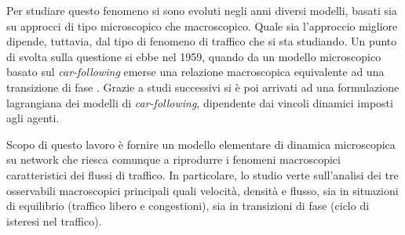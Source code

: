 \documentclass[../main.tex]{subfiles}
\begin{document}
Per studiare questo fenomeno si sono evoluti negli anni diversi modelli, basati sia su approcci di tipo microscopico che macroscopico.
Quale sia l'approccio migliore dipende, tuttavia, dal tipo di fenomeno di traffico che si sta studiando.
Un punto di svolta sulla questione si ebbe nel 1959, quando da un modello microscopico basato sul \emph{car-following} emerse una relazione macroscopica equivalente ad una transizione di fase \cite{gazis2002origins}.
Grazie a studi successivi si \`e poi arrivati ad una formulazione lagrangiana dei modelli di \emph{car-following}, dipendente dai vincoli dinamici imposti agli agenti.

Scopo di questo lavoro \`e fornire un modello elementare di dinamica microscopica su network che riesca comunque a riprodurre i fenomeni macroscopici caratteristici dei flussi di traffico.
In particolare, lo studio verte sull'analisi dei tre osservabili macroscopici principali quali velocit\`a, densit\`a e flusso, sia in situazioni di equilibrio (traffico libero e congestioni), sia in transizioni di fase (ciclo di isteresi nel traffico).
\end{document}
